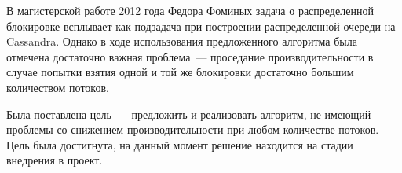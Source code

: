 В магистерской работе 2012 года Федора Фоминых задача о распределенной блокировке всплывает как подзадача при построении распределенной очереди на Cassandra. Однако в ходе использования предложенного алгоритма была отмечена достаточно важная проблема~--- проседание производительности в случае попытки взятия одной и той же блокировки достаточно большим количеством потоков.

Была поставлена цель~--- предложить и реализовать алгоритм, не имеющий проблемы со снижением производительности при любом количестве потоков. Цель была достигнута, на данный момент решение находится на стадии внедрения в проект.